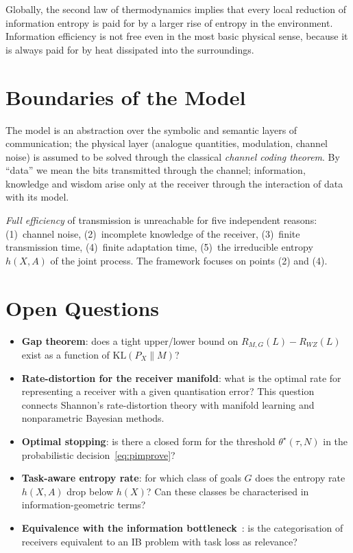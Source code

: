 \documentclass[11pt,a4paper]{article}
\begin{document}
Globally, the second law of thermodynamics implies that every local
reduction of information entropy is paid for by a larger rise of
entropy in the environment. Information efficiency is not free even
in the most basic physical sense, because it is always paid for by
heat dissipated into the surroundings.

\section{Boundaries of the Model}

The model is an abstraction over the symbolic and semantic layers of
communication; the physical layer (analogue quantities, modulation,
channel noise) is assumed to be solved through the classical
\emph{channel coding theorem}. By ``data'' we mean the bits
transmitted through the channel; information, knowledge and wisdom
arise only at the receiver through the interaction of data with its
model.

\emph{Full efficiency} of transmission is unreachable for five
independent reasons: (1)~channel noise, (2)~incomplete knowledge of
the receiver, (3)~finite transmission time, (4)~finite adaptation
time, (5)~the irreducible entropy $h(X,A)$ of the joint process. The
framework focuses on points (2) and (4).

\section{Open Questions}

\begin{itemize}
    \item \textbf{Gap theorem}: does a tight upper/lower bound on
          $R_{M,G}(L) - R_{WZ}(L)$ exist as a function of
          $\text{KL}(P_X\|M)$?
    \item \textbf{Rate-distortion for the receiver manifold}: what is
          the optimal rate for representing a receiver with a given
          quantisation error? This question connects Shannon's
          rate-distortion theory with manifold learning and
          nonparametric Bayesian methods.
    \item \textbf{Optimal stopping}: is there a closed form for the
          threshold $\theta^\star(\tau, N)$ in the probabilistic
          decision~\eqref{eq:pimprove}?
    \item \textbf{Task-aware entropy rate}: for which class of goals
          $G$ does the entropy rate $h(X,A)$ drop below $h(X)$? Can
          these classes be characterised in
          information-geometric terms?
    \item \textbf{Equivalence with the information
          bottleneck}~\cite{tishby1999}: is the categorisation of
          receivers equivalent to an IB problem with task loss as
          relevance?
\end{itemize}
\end{document}
